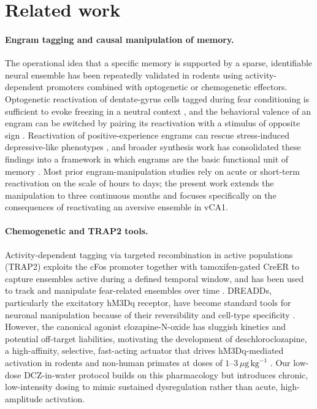\documentclass[11pt]{article}
\begin{document}
\section{Related work}

\paragraph{Engram tagging and causal manipulation of memory.}
The operational idea that a specific memory is supported by a sparse, identifiable neural ensemble has been repeatedly validated in rodents using activity-dependent promoters combined with optogenetic or chemogenetic effectors. Optogenetic reactivation of dentate-gyrus cells tagged during fear conditioning is sufficient to evoke freezing in a neutral context \citep{liu2012engram}, and the behavioral valence of an engram can be switched by pairing its reactivation with a stimulus of opposite sign \citep{redondo2014valence}. Reactivation of positive-experience engrams can rescue stress-induced depressive-like phenotypes \citep{ramirez2015positive}, and broader synthesis work has consolidated these findings into a framework in which engrams are the basic functional unit of memory \citep{josselyn2020engram}. Most prior engram-manipulation studies rely on acute or short-term reactivation on the scale of hours to days; the present work extends the manipulation to three continuous months and focuses specifically on the consequences of reactivating an aversive ensemble in vCA1.

\paragraph{Chemogenetic and TRAP2 tools.}
Activity-dependent tagging via targeted recombination in active populations (TRAP2) exploits the cFos promoter together with tamoxifen-gated CreER to capture ensembles active during a defined temporal window, and has been used to track and manipulate fear-related ensembles over time \citep{denardo2019temporal}. DREADDs, particularly the excitatory hM3Dq receptor, have become standard tools for neuronal manipulation because of their reversibility and cell-type specificity \citep{roth2016dreadds}. However, the canonical agonist clozapine-N-oxide has sluggish kinetics and potential off-target liabilities, motivating the development of deschloroclozapine, a high-affinity, selective, fast-acting actuator that drives hM3Dq-mediated activation in rodents and non-human primates at doses of $1$--$3\,\mu\mathrm{g}\,\mathrm{kg}^{-1}$ \citep{nagai2020dcz}. Our low-dose DCZ-in-water protocol builds on this pharmacology but introduces chronic, low-intensity dosing to mimic sustained dysregulation rather than acute, high-amplitude activation.
\end{document}
